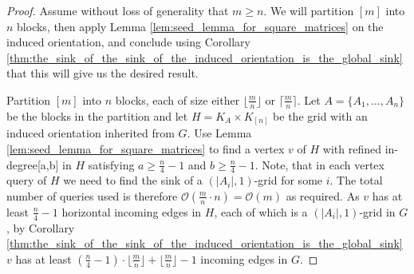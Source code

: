 \documentclass[a4paper,10pt]{article}
\newcommand{\indegree}{refined in-degree\xspace}
\begin{document}
\begin{proof}
 Assume without loss of generality that $m \geq n$. We will partition $[m]$ into $n$ blocks, then apply Lemma \ref{lem:seed_lemma_for_square_matrices} on the induced orientation, and conclude using Corollary \ref{thm:the_sink_of_the_sink_of_the_induced_orientation_is_the_global_sink} that this will give us the desired result. 
 
 Partition $[m]$ into $n$ blocks, each of size either $\lfloor \frac{m}{n} \rfloor$ or $\lceil \frac{m}{n} \rceil$. Let $A = \{A_1,\ldots,A_n\}$ be the blocks in the partition and let $H = K_A\times K_{[n]}$ be the grid with an induced orientation inherited from $G$. Use Lemma \ref{lem:seed_lemma_for_square_matrices} to find a vertex $v$ of $H$ with \indegree [a,b] in $H$ satisfying $a \geq \frac{n}{4} - 1$ and $b \geq \frac{n}{4} - 1$. Note, that in each vertex query of $H$ we need to find the sink of a $(|A_i|,1)$-grid for some $i$. The total number of queries used is therefore $\mathcal{O}(\frac{m}{n}\cdot n) = \mathcal{O}(m)$ as required. As $v$ has at least $\frac{n}{4} - 1$ horizontal incoming edges in $H$, each of which is a $(|A_i|,1)$-grid in $G$, by Corollary \ref{thm:the_sink_of_the_sink_of_the_induced_orientation_is_the_global_sink} $v$ has at least $(\frac{n}{4} - 1)\cdot\lfloor \frac{m}{n} \rfloor + \lfloor \frac{m}{n} \rfloor - 1$ incoming edges in $G$.
\end{proof}


\end{document}
